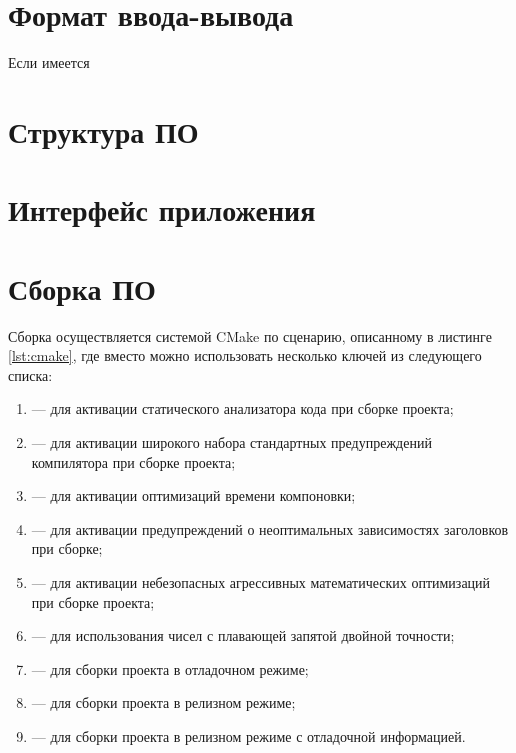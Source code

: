 \section{Формат ввода-вывода}

Если имеется

\section{Структура ПО}

\section{Интерфейс приложения}

\section{Сборка ПО}

Сборка осуществляется системой CMake по сценарию, описанному в листинге \ref{lst:cmake}, где вместо \code{[options...]} можно использовать несколько ключей из следующего списка:
\begin{enumerate}
	\item {} — для активации статического анализатора кода при сборке проекта;
	\item {} — для активации широкого набора стандартных предупреждений компилятора при сборке проекта;
	\item {} — для активации оптимизаций времени компоновки;
	\item {} — для активации предупреждений о неоптимальных зависимостях заголовков при сборке;
	\item {} — для активации небезопасных агрессивных математических оптимизаций при сборке проекта;
	\item {} — для использования чисел с плавающей запятой двойной точности;
	\item {} — для сборки проекта в отладочном режиме;
	\item {} — для сборки проекта в релизном режиме;
	\item {} — для сборки проекта в релизном режиме с отладочной информацией.
\end{enumerate}

